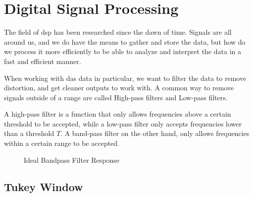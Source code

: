 \section{Digital Signal Processing}

The field of \acrfull{dsp} has been researched since the dawn of time. Signals are all around us, and we do have the means to gather and store the data, but how do we process it more efficiently to be able to analyze and interpret the data in a fast and efficient manner.

When working with \acrshort{das} data in particular, we want to filter the data to remove distortion, and get cleaner outputs to work with. A common way to remove signals outside of a range are called High-pass filters and Low-pass filters. 

A high-pass filter is a function that only allows frequencies above a certain threshold to be accepted, while a low-pass filter only accepts frequencies lower than a threshold $T$. A band-pass filter on the other hand, only allows frequencies within a certain range to be accepted.

\begin{figure}[h]
\centering
{}
\caption{Ideal Bandpass Filter Response}
\end{figure}


\subsection{Tukey Window}
\label{dsp:tukey}

